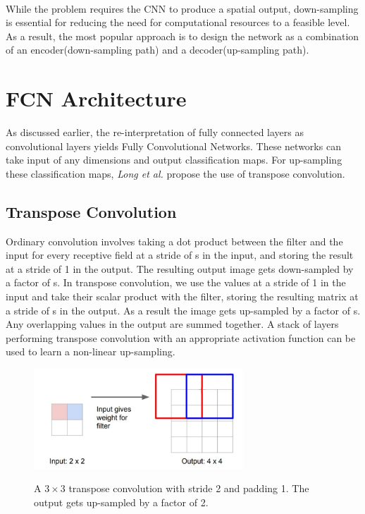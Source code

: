 \documentclass[12pt, a4paper]{report}
\begin{document}
\paragraph{}
While the problem requires the CNN to produce a spatial output, down-sampling is essential for reducing the need for computational resources to a feasible level. As a result, the most popular approach is to design the network as a combination of an encoder(down-sampling path) and a decoder(up-sampling path).\\
\section{FCN Architecture}
As discussed earlier, the re-interpretation of fully connected layers as convolutional layers yields Fully Convolutional Networks. These networks can take input of any dimensions and output classification maps. For up-sampling these classification maps, \textit{Long et al.}\cite{long2015fully} propose the use of transpose convolution. 
\subsection{Transpose Convolution}
Ordinary convolution involves taking a dot product between the filter and the input for every receptive field at a stride of s in the input, and storing the result at a stride of 1 in the output. The resulting output image gets down-sampled by a factor of s. In transpose convolution, we use the values at a stride of 1 in the input and take their scalar product with the filter, storing the resulting matrix at a stride of s in the output. As a result the image gets up-sampled by a factor of s. Any overlapping values in the output are summed together.\cite{long2015fully, cs231n}
A stack of layers performing transpose convolution with an appropriate activation function can be used to learn a non-linear up-sampling.\cite{long2015fully}\begin{figure}[h]
\centering
\includegraphics[width=0.7\textwidth]{fcn.jpg}
\caption{A $3 \times 3$ transpose convolution with stride 2 and padding 1. The output gets up-sampled by a factor of 2.}
\cite{cs231n}
\end{figure}
\end{document}

